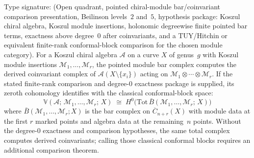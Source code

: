 \begin{proposition}
\label{prop:conformal-blocks-bar}
Type signature: \textup{(}Open quadrant, pointed chiral-module
bar/coinvariant comparison presentation, Beilinson levels~$2$ and~$5$,
hypothesis package: Koszul chiral algebra, Koszul module insertions,
holonomic degreewise finite pointed bar terms, exactness above
degree~$0$ after coinvariants, and a TUY/Hitchin or equivalent
finite-rank conformal-block comparison for the chosen module
category\textup{)}.
For a Koszul chiral algebra $\mathcal{A}$ on a curve $X$ of
genus~$g$ with Koszul module insertions
$\mathcal{M}_1, \ldots, \mathcal{M}_r$, the pointed module bar
complex computes the derived coinvariant complex of
$\mathcal A(X\setminus\{x_i\})$ acting on
$\mathcal{M}_1\otimes\cdots\otimes\mathcal{M}_r$. If the stated
finite-rank comparison and degree-$0$ exactness package is supplied,
its zeroth cohomology identifies with the classical conformal-block
space:
\begin{equation}\label{eq:conformal-blocks-bar}
\mathbb{V}(\mathcal{A};\, \mathcal{M}_1, \ldots, \mathcal{M}_r;\, X)
\;\cong\;
H^0\bigl(
 \mathrm{Tot}\,
 \bar{B}(\mathcal{M}_1, \ldots, \mathcal{M}_r;\, X)
\bigr)
\end{equation}
where $\bar{B}(\mathcal{M}_1, \ldots, \mathcal{M}_r; X)$ is the
bar complex on $\overline{C}_{n+r}(X)$ with module data at the
first $r$ marked points and algebra data at the remaining~$n$
points. Without the degree-$0$ exactness and comparison hypotheses, the
same total complex computes derived coinvariants; calling those
classical conformal blocks requires an additional comparison theorem.
\end{proposition}

